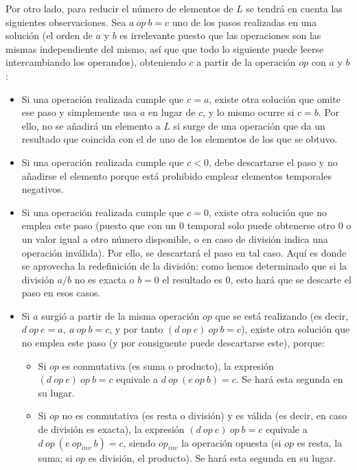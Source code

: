 Por otro lado, para reducir el número de elementos de $L$ se tendrá en cuenta
las siguientes observaciones. Sea $a\ op\ b = c$ uno de los pasos realizadas en
una solución (el orden de $a$ y $b$ es irrelevante puesto que las operaciones
son las mismas independiente del mismo, así que que todo lo siguiente puede
leerse intercambiando los operandos), obteniendo $c$ a partir de la operación
$op$ con $a$ y $b$:

\begin{itemize}
	\item Si una operación realizada cumple que $c=a$, existe otra solución que
	omite ese paso y simplemente usa $a$ en lugar de $c$, y lo mismo ocurre si
	$c=b$. Por ello, no se añadirá un elemento a $L$ si surge de una operación
	que da un resultado que coincida con el de uno de los elementos de los que se
	obtuvo.
  \item Si una operación realizada cumple que $c < 0$, debe descartarse el paso
  y no añadirse el elemento porque está prohibido emplear elementos temporales
  negativos.
	\item Si una operación realizada cumple que $c = 0$, existe otra solución que
  no emplea este paso (puesto que con un $0$ temporal solo puede obtenerse otro
  $0$ o un valor igual a otro número disponible, o en caso de división indica
  una operación inválida). Por ello, se descartará el paso en tal caso. Aquí es
  donde se aprovecha la redefinición de la división: como hemos determinado que
  si la división $a/b$ no es exacta o $b=0$ el resultado es $0$, esto hará que
  se descarte el paso en esos casos.
	\item Si $a$ surgió a partir de la misma operación $op$ que se está realizando
  (es decir, $d\ op\ e = a,\ a\ op\ b = c$, y por tanto $(d\ op\ e)\ op\ b = c$),
  existe otra solución que no emplea este paso (y por consiguente puede
  descartarse este), porque:
	\begin{itemize}
		\item Si $op$ es conmutativa (es suma o producto), la expresión
		$(d\ op\ e)\ op\ b = c$ equivale a $d\ op\ (e\ op\ b) = c$. Se hará esta
		segunda en su lugar.
		\item Si $op$ no es conmutativa (es resta o división) y es válida (es decir,
		en caso de división es exacta), la expresión $(d\ op\ e)\ op\ b = c$
		equivale a $d\ op\ (e\ op_{inv}\ b) = c$, siendo $op_{inv}$ la operación
		opuesta (si $op$ es resta, la suma; si $op$ es división, el producto).
		Se hará esta segunda en su lugar.
	\end{itemize}

\end{itemize}
